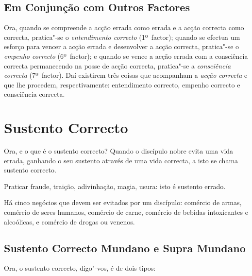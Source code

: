 \subsection{Em Conjunção com Outros Factores}

Ora, quando se compreende a acção errada como errada e a acção correcta como
correcta, pratica"-se o \emph{entendimento correcto} (1º~factor); quando se
efectua um esforço para vencer a acção errada e desenvolver a acção correcta,
pratica"-se o \emph{empenho correcto} (6º~factor); e quando se vence a acção
errada com a consciência correcta permanecendo na posse de acção correcta,
pratica"-se a \emph{consciência correcta} (7º~factor). Daí existirem três coisas
que acompanham a \emph{acção correcta} e que lhe procedem, respectivamente:
entendimento correcto, empenho correcto e consciência correcta.


\section{Sustento Correcto}



Ora, e o que é o sustento correcto? Quando o discípulo nobre evita uma vida
errada, ganhando o seu sustento através de uma vida correcta, a isto se chama
sustento correcto.



Praticar fraude, traição, adivinhação, magia, usura: isto é sustento errado.



Há cinco negócios que devem ser evitados por um discípulo: comércio de armas,
comércio de seres humanos, comércio de carne, comércio de bebidas intoxicantes e
alcoólicas, e comércio de drogas ou venenos.


\subsection{Sustento Correcto Mundano e Supra Mundano}

Ora, o sustento correcto, digo"-vos, é de dois tipos:

